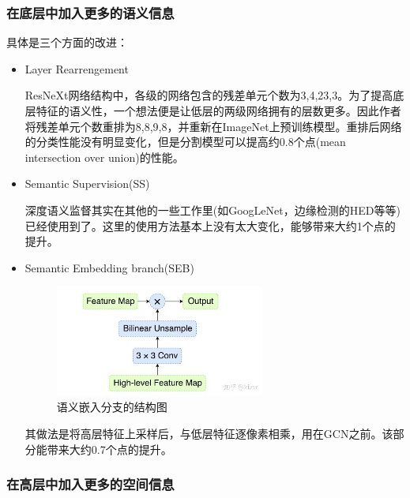 \subsubsection{在底层中加入更多的语义信息}
具体是三个方面的改进：
\begin{itemize}
\item Layer Rearrengement

 ResNeXt网络结构中，各级的网络包含的残差单元个数为{3,4,23,3}。为了提高底层特征的语义性，一个想法便是让低层的两级网络拥有的层数更多。因此作者将残差单元个数重排为{8,8,9,8}，并重新在ImageNet上预训练模型。重排后网络的分类性能没有明显变化，但是分割模型可以提高约0.8个点(mean intersection over union)的性能。

\item Semantic Supervision(SS)

深度语义监督其实在其他的一些工作里(如GoogLeNet，边缘检测的HED等等)已经使用到了。这里的使用方法基本上没有太大变化，能够带来大约1个点的提升。

\item Semantic Embedding branch(SEB)

\begin{figure}[!hbtp]
\centering
\includegraphics[width=0.65\textwidth]{SemanticSLAM/ExFusion1.jpg}
\caption{语义嵌入分支的结构图}
\label{ExFusion1}
\end{figure}

 其做法是将高层特征上采样后，与低层特征逐像素相乘，用在GCN之前。该部分能带来大约0.7个点的提升。

\end{itemize}

\subsubsection{在高层中加入更多的空间信息}

